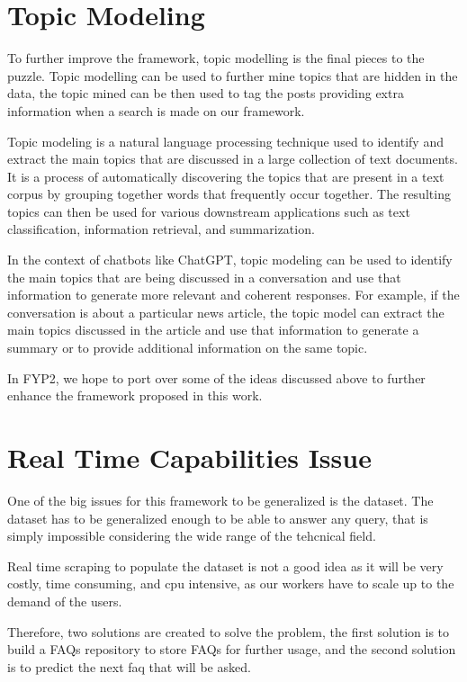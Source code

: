 \section{Topic Modeling}
To further improve the framework, topic modelling is the final pieces to the puzzle. Topic modelling can be used to further mine topics that are hidden in the data, the topic mined can be then used to tag the posts providing extra information when a search is made on our framework.

Topic modeling is a natural language processing technique used to identify and extract the main topics that are discussed in a large collection of text documents. It is a process of automatically discovering the topics that are present in a text corpus by grouping together words that frequently occur together. The resulting topics can then be used for various downstream applications such as text classification, information retrieval, and summarization.

In the context of chatbots like ChatGPT, topic modeling can be used to identify the main topics that are being discussed in a conversation and use that information to generate more relevant and coherent responses. For example, if the conversation is about a particular news article, the topic model can extract the main topics discussed in the article and use that information to generate a summary or to provide additional information on the same topic.

In FYP2, we hope to port over some of the ideas discussed above to further enhance the framework proposed in this work.

\section{Real Time Capabilities Issue} \label{real-time-capabilities}
One of the big issues for this framework to be generalized is the dataset. The dataset has to be generalized enough to be able to answer any query, that is simply impossible considering the wide range of the tehcnical field.

Real time scraping to populate the dataset is not a good idea as it will be very costly, time consuming, and cpu intensive, as our workers have to scale up to the demand of the users. 

Therefore, two solutions are created to solve the problem, the first solution is to build a FAQs repository to store FAQs for further usage, and the second solution is to predict the next faq that will be asked.


